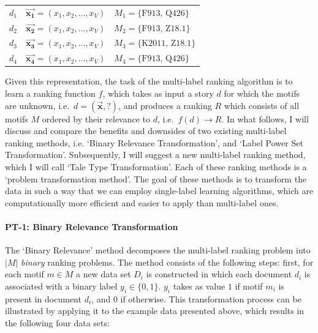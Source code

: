 \begin{table}[h]
\centering
\begin{tabular}{l|l|l}
\toprule
$d_1$ & $\vec{\mathbf{x_1}} = (x_1, x_2, \ldots, x_V)$ & $M_1 = \{ \text{F913, Q426}\}$ \\
$d_2$ & $\vec{\mathbf{x_2}} = (x_1, x_2, \ldots, x_V)$ & $M_2 = \{ \text{F913, Z18.1}\}$ \\
$d_3$ & $\vec{\mathbf{x_3}} = (x_1, x_2, \ldots, x_V)$ & $M_3 = \{ \text{K2011, Z18.1}\}$ \\
$d_4$ & $\vec{\mathbf{x_4}} = (x_1, x_2, \ldots, x_V)$ & $M_4 = \{ \text{F913, Q426}\}$ \\
\bottomrule
\end{tabular}
\end{table}

\noindent Given this representation, the task of the multi-label ranking algorithm is to learn a ranking function $f$, which takes as input a story $d$ for which the motifs are unknown, i.e.\ $d = (\vec{\mathbf{x}}, ?)$, and produces a ranking $R$ which consists of all motifs $M$ ordered by their relevance to $d$, i.e.\ $f(d) \rightarrow R$. In what follows, I will discuss and compare the benefits and downsides of two existing multi-label ranking methods, i.e. `Binary Relevance Transformation', and `Label Power Set Transformation'. Subsequently, I will suggest a new multi-label ranking method, which I will call `Tale Type Transformation'. Each of these ranking methods is a `problem transformation method'\autocite{tsoumakas:2007,tsoumakas:2010}. The goal of these methods is to transform the data in such a way that we can employ single-label learning algorithms, which are computationally more efficient and easier to apply than multi-label ones.

\paragraph{PT-1: Binary Relevance Transformation}

The `Binary Relevance' method decomposes the multi-label ranking problem into $|M|$ \emph{binary} ranking problems. The method consists of the following steps: first, for each motif $m \in M$ a new data set $D_i$ is constructed in which each document $d_i$ is associated with a binary label $y_i \in \{0, 1\}$. $y_i$ takes as value $1$ if motif $m_i$ is present in document $d_i$, and $0$ if otherwise. This transformation process can be illustrated by applying it to the example data presented above, which results in the following four data sets:

